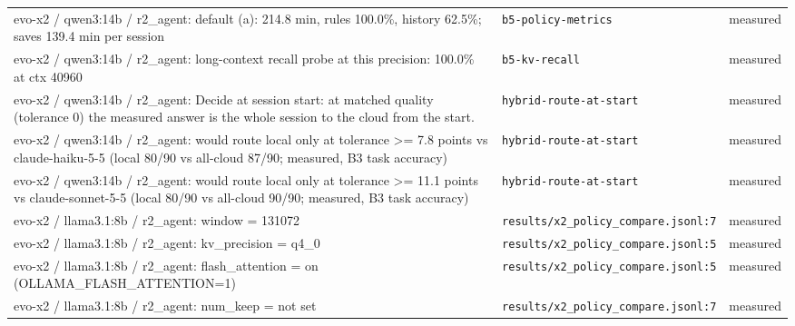\begin{longtable}{>{\raggedright\arraybackslash}p{}>{\raggedright\arraybackslash}p{}>{\raggedright\arraybackslash}p{}}
\small evo-x2 / qwen3:14b / r2\_agent: default (a): 214.8 min, rules 100.0\%, history 62.5\%; saves 139.4 min per session & {\footnotesize \texttt{b5-\allowbreak{}policy-\allowbreak{}metrics}} & \small measured \\

\small evo-x2 / qwen3:14b / r2\_agent: long-context recall probe at this precision: 100.0\% at ctx 40960 & {\footnotesize \texttt{b5-\allowbreak{}kv-\allowbreak{}recall}} & \small measured \\

\small evo-x2 / qwen3:14b / r2\_agent: Decide at session start: at matched quality (tolerance 0) the measured answer is the whole session to the cloud from the start. & {\footnotesize \texttt{hybrid-\allowbreak{}route-\allowbreak{}at-\allowbreak{}start}} & \small measured \\

\small evo-x2 / qwen3:14b / r2\_agent: would route local only at tolerance \textgreater{}= 7.8 points vs claude-haiku-5-5 (local 80/90 vs all-cloud 87/90; measured, B3 task accuracy) & {\footnotesize \texttt{hybrid-\allowbreak{}route-\allowbreak{}at-\allowbreak{}start}} & \small measured \\

\small evo-x2 / qwen3:14b / r2\_agent: would route local only at tolerance \textgreater{}= 11.1 points vs claude-sonnet-5-5 (local 80/90 vs all-cloud 90/90; measured, B3 task accuracy) & {\footnotesize \texttt{hybrid-\allowbreak{}route-\allowbreak{}at-\allowbreak{}start}} & \small measured \\

\small evo-x2 / llama3.1:8b / r2\_agent: window = 131072 & {\footnotesize \texttt{results/\allowbreak{}x2\_\allowbreak{}policy\_\allowbreak{}compare.\allowbreak{}jsonl:\allowbreak{}7}} & \small measured \\

\small evo-x2 / llama3.1:8b / r2\_agent: kv\_precision = q4\_0 & {\footnotesize \texttt{results/\allowbreak{}x2\_\allowbreak{}policy\_\allowbreak{}compare.\allowbreak{}jsonl:\allowbreak{}5}} & \small measured \\

\small evo-x2 / llama3.1:8b / r2\_agent: flash\_attention = on (OLLAMA\_FLASH\_ATTENTION=1) & {\footnotesize \texttt{results/\allowbreak{}x2\_\allowbreak{}policy\_\allowbreak{}compare.\allowbreak{}jsonl:\allowbreak{}5}} & \small measured \\

\small evo-x2 / llama3.1:8b / r2\_agent: num\_keep = not set & {\footnotesize \texttt{results/\allowbreak{}x2\_\allowbreak{}policy\_\allowbreak{}compare.\allowbreak{}jsonl:\allowbreak{}7}} & \small measured \\


\end{longtable}

